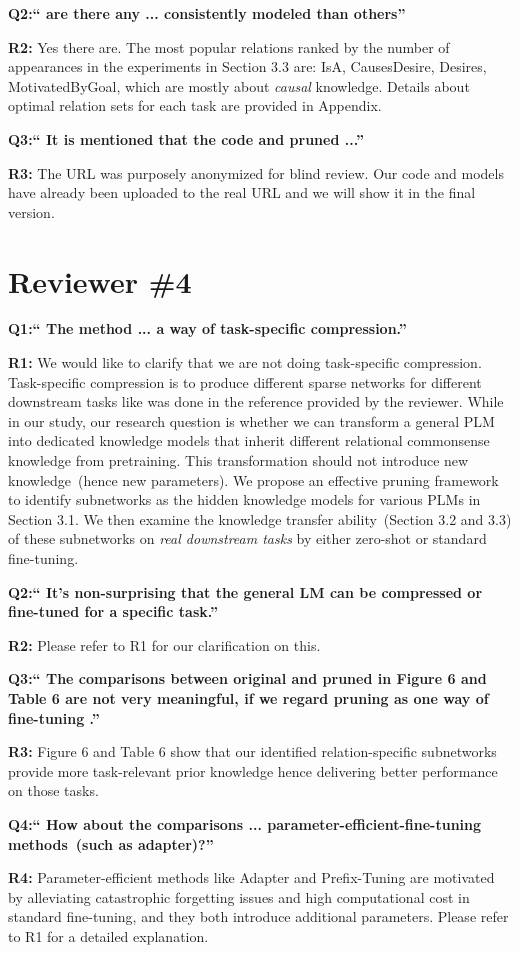 \documentclass[letterpaper]{article} %
\begin{document}
\noindent
\textbf{Q2:`` are there any ... consistently modeled than others''}

\noindent
\textbf{R2:} Yes there are. The most popular relations ranked by the number of appearances in the experiments in Section 3.3 are: IsA, CausesDesire, Desires, MotivatedByGoal, which are mostly about \textit{causal} knowledge. Details about optimal relation sets for each task are provided in Appendix.

\noindent
\textbf{Q3:`` It is mentioned that the code and pruned  ...''}

\noindent
\textbf{R3:} The URL was purposely anonymized for blind
review. Our code and models have already been uploaded to the real URL 
and we will show it in the final version.

\section*{Reviewer \#4}
\noindent
\textbf{Q1:`` The method  ... a way of task-specific compression.''}

\noindent
\textbf{R1:} We would like to clarify that we are not doing task-specific compression. Task-specific compression is to produce different sparse networks for different downstream tasks like was done in the reference provided by the reviewer. While in our study, our research question is whether we can transform a general PLM into dedicated knowledge models that inherit different relational commonsense knowledge from pretraining. This transformation should not introduce new knowledge~(hence new parameters). We propose an effective pruning framework to identify subnetworks as the hidden knowledge models for various PLMs in Section 3.1. We then examine the knowledge transfer ability~(Section 3.2 and 3.3) of these subnetworks on \textit{real downstream tasks} by either zero-shot or standard fine-tuning.

\noindent
\textbf{Q2:`` It's non-surprising that the general LM can be compressed or fine-tuned for a specific task.''}

\noindent
\textbf{R2:} Please refer to R1 for our clarification on this.

\noindent
\textbf{Q3:`` The comparisons between original and pruned in Figure 6 and Table 6 are not very meaningful, if we regard pruning as one way of fine-tuning .''}

\noindent
\textbf{R3:} Figure 6 and Table 6 show that our identified relation-specific subnetworks provide more task-relevant prior knowledge hence delivering better performance on those tasks.

\noindent
\textbf{Q4:`` How about the comparisons ...  parameter-efficient-fine-tuning methods~(such as adapter)?''}

\noindent
\textbf{R4:} Parameter-efficient methods like Adapter and Prefix-Tuning are motivated by alleviating catastrophic forgetting issues and high computational cost in standard fine-tuning, and they both introduce additional parameters. Please refer to R1 for a detailed explanation.

% 
\end{document}
